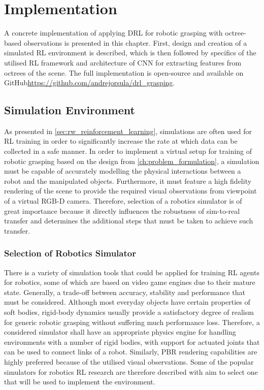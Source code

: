 \chapter{Implementation}\label{ch:implementation}

A concrete implementation of applying DRL for robotic grasping with octree-based observations is presented in this chapter. First, design and creation of a simulated RL environment is described, which is then followed by specifics of the utilised RL framework and architecture of CNN for extracting features from octrees of the scene. The full implementation is open-source and available on GitHub\href{https://github.com/andrejorsula/drl_grasping}{https://github.com/andrejorsula/drl\_grasping}.


\section{Simulation Environment}\label{sec:impl_simulation_environment}

As presented in \autoref{sec:rw_reinforcement_learning}, simulations are often used for RL training in order to significantly increase the rate at which data can be collected in a safe manner. In order to implement a virtual setup for training of robotic grasping based on the design from \autoref{ch:problem_formulation}, a simulation must be capable of accurately modelling the physical interactions between a robot and the manipulated objects. Furthermore, it must feature a high fidelity rendering of the scene to provide the required visual observations from viewpoint of a virtual RGB-D camera. Therefore, selection of a robotics simulator is of great importance because it directly influences the robustness of sim-to-real transfer and determines the additional steps that must be taken to achieve such transfer.


\subsection{Selection of Robotics Simulator}

There is a variety of simulation tools that could be applied for training RL agents for robotics, some of which are based on video game engines due to their mature state. Generally, a trade-off between accuracy, stability and performance that must be considered. Although most everyday objects have certain properties of soft bodies, rigid-body dynamics usually provide a satisfactory degree of realism for generic robotic grasping without suffering much performance loss. Therefore, a considered simulator shall have an appropriate physics engine for handling environments with a number of rigid bodies, with support for actuated joints that can be used to connect links of a robot. Similarly, PBR rendering capabilities are highly preferred because of the utilised visual observations. Some of the popular simulators for robotics RL research are therefore described with aim to select one that will be used to implement the environment.

